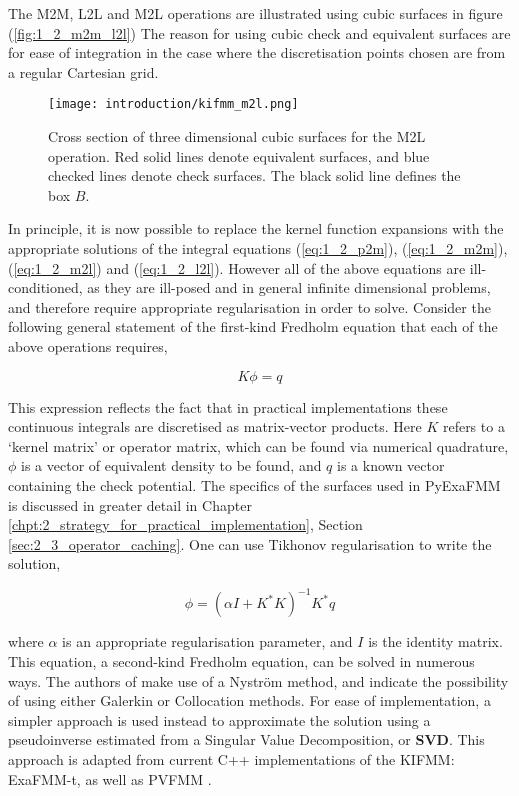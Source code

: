 The \gls{M2M}, \gls{L2L} and \gls{M2L} operations are illustrated using cubic surfaces in figure (\ref{fig:1_2_m2m_l2l})
The reason for using cubic check and equivalent surfaces are for ease of integration
in the case where the discretisation points chosen are from a regular Cartesian
grid.

\begin{figure}[!h]
    \centering
    {\texttt{[image: introduction/kifmm\_m2l.png]}}
    \caption{Cross section of three dimensional cubic surfaces for the \gls{M2L} operation.
    Red solid lines denote equivalent surfaces, and blue checked lines denote check surfaces.
    The black solid line defines the box $B$.}
  \label{fig:1_2_m2l}
\end{figure}

In principle, it is now possible to replace the kernel function expansions with
the appropriate solutions of the integral equations (\ref{eq:1_2_p2m}),
(\ref{eq:1_2_m2m}), (\ref{eq:1_2_m2l}) and (\ref{eq:1_2_l2l}). However all of
the above equations are ill-conditioned, as they are ill-posed and in general infinite
dimensional problems, and therefore require appropriate regularisation in order to solve.
Consider the following general statement of the first-kind Fredholm equation
that each of the above operations requires,

\begin{equation}
K \phi = q
\label{eq:1_2_first_kind_fredholm}
\end{equation}

This expression reflects the fact that in practical implementations these continuous
integrals are discretised as matrix-vector products. Here $K$ refers to a
`kernel matrix' or operator matrix, which can be found via numerical quadrature, $\phi$ is a vector
of equivalent density to be found, and $q$ is a known vector containing the check
potential. The specifics of the surfaces used in PyExaFMM is discussed in
greater detail in Chapter \ref{chpt:2_strategy_for_practical_implementation},
Section \ref{sec:2_3_operator_caching}. One can use Tikhonov regularisation to
write the solution,

\begin{equation}
\phi = (\alpha I + K^*K)^{-1}K^*q
\label{eq:1_2_tikhonov}
\end{equation}

where $\alpha$ is an appropriate regularisation parameter, and $I$ is the identity
matrix. This equation, a second-kind Fredholm equation, can be solved in numerous
ways. The authors of \cite{Ying:2004:JCP} make use of a Nyström method, and indicate
the possibility of using either Galerkin or Collocation methods. For ease of
implementation, a simpler approach is used instead to approximate the solution using a pseudoinverse
estimated from a Singular Value Decomposition, or \textbf{\gls{SVD}}. This
approach is adapted from current C++ implementations of the \gls{KIFMM}: ExaFMM-t,
as well as PVFMM \cite{Malhotra:2015:CCP,exafmm}.

